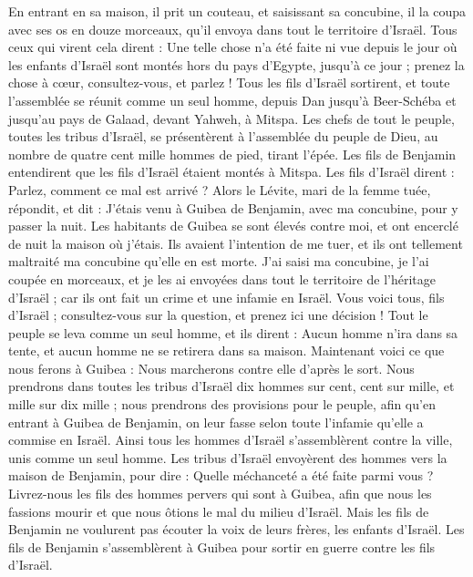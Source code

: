 \begin{multicols}{2}
En entrant en sa maison, il prit un couteau, et saisissant sa concubine, il la coupa avec ses os en douze morceaux, qu'il envoya dans tout le territoire d'Israël.
Tous ceux qui virent cela dirent : Une telle chose n'a été faite ni vue depuis le jour où les enfants d'Israël sont montés hors du pays d'Egypte, jusqu'à ce jour ; prenez la chose à cœur, consultez-vous, et parlez !
\VerseOne{}Tous les fils d'Israël sortirent, et toute l'assemblée se réunit comme un seul homme, depuis Dan jusqu'à Beer-Schéba et jusqu'au pays de Galaad, devant Yahweh, à Mitspa.
Les chefs de tout le peuple, toutes les tribus d'Israël, se présentèrent à l'assemblée du peuple de Dieu, au nombre de quatre cent mille hommes de pied, tirant l'épée.
Les fils de Benjamin entendirent que les fils d'Israël étaient montés à Mitspa. Les fils d'Israël dirent : Parlez, comment ce mal est arrivé ?
Alors le Lévite, mari de la femme tuée, répondit, et dit : J'étais venu à Guibea de Benjamin, avec ma concubine, pour y passer la nuit.
Les habitants de Guibea se sont élevés contre moi, et ont encerclé de nuit la maison où j'étais. Ils avaient l'intention de me tuer, et ils ont tellement maltraité ma concubine qu'elle en est morte.
J'ai saisi ma concubine, je l'ai coupée en morceaux, et je les ai envoyées dans tout le territoire de l'héritage d'Israël ; car ils ont fait un crime et une infamie en Israël.
Vous voici tous, fils d'Israël ; consultez-vous sur la question, et prenez ici une décision !
Tout le peuple se leva comme un seul homme, et ils dirent : Aucun homme n'ira dans sa tente, et aucun homme ne se retirera dans sa maison.
Maintenant voici ce que nous ferons à Guibea : Nous marcherons contre elle d'après le sort.
Nous prendrons dans toutes les tribus d'Israël dix hommes sur cent, cent sur mille, et mille sur dix mille ; nous prendrons des provisions pour le peuple, afin qu'en entrant à Guibea de Benjamin, on leur fasse selon toute l'infamie qu'elle a commise en Israël.
Ainsi tous les hommes d'Israël s'assemblèrent contre la ville, unis comme un seul homme.
Les tribus d'Israël envoyèrent des hommes vers la maison de Benjamin, pour dire : Quelle méchanceté a été faite parmi vous ?
Livrez-nous les fils des hommes pervers qui sont à Guibea, afin que nous les fassions mourir et que nous ôtions le mal du milieu d'Israël. Mais les fils de Benjamin ne voulurent pas écouter la voix de leurs frères, les enfants d'Israël.
Les fils de Benjamin s'assemblèrent à Guibea pour sortir en guerre contre les fils d'Israël.

\end{multicols}
